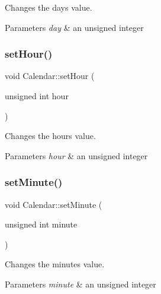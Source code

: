 Changes the day\textquotesingle{}s value. 


\begin{DoxyParams}{Parameters}
{\em day} & an unsigned integer \\
\hline
\end{DoxyParams}
\mbox{\label{class_calendar_a6f3e8a86bdbf5ad261084b91a6f880e7}} 
\subsubsection{\texorpdfstring{set\+Hour()}{setHour()}}
{\footnotesize\ttfamily void Calendar\+::set\+Hour (\begin{DoxyParamCaption}\item[{unsigned int}]{hour }\end{DoxyParamCaption})}



Changes the hour\textquotesingle{}s value. 


\begin{DoxyParams}{Parameters}
{\em hour} & an unsigned integer \\
\hline
\end{DoxyParams}
\mbox{\label{class_calendar_a94365aea1df3a5085054d61bfa893e41}} 
\subsubsection{\texorpdfstring{set\+Minute()}{setMinute()}}
{\footnotesize\ttfamily void Calendar\+::set\+Minute (\begin{DoxyParamCaption}\item[{unsigned int}]{minute }\end{DoxyParamCaption})}



Changes the minute\textquotesingle{}s value. 


\begin{DoxyParams}{Parameters}
{\em minute} & an unsigned integer \\
\hline
\end{DoxyParams}
\mbox{\label{class_calendar_a66115274b1543b8a393d4cd92195e746}} 
